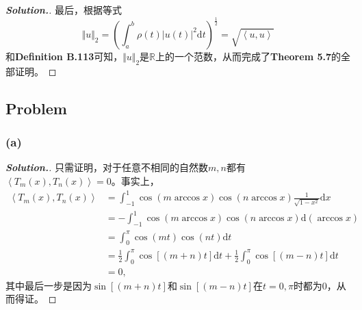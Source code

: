 \documentclass{ctexart}
\begin{document}
\begin{sloppypar}
\begin{proof}[\textbf{Solution.}]
最后，根据等式
\begin{equation}
    \Vert u \Vert_2 = \left(\int_a^b \rho (t)|u(t)|^2 \mathrm{d}t \right)^{\frac{1}{2}} = \sqrt{\left \langle u,u \right \rangle}
\end{equation}
和\textbf{Definition B.113}可知，$\Vert u \Vert_2$是$\mathbb{R}$上的一个范数，从而完成了\textbf{Theorem 5.7}的全部证明。
\end{proof}

\subsection*{Problem \uppercase\expandafter{}}
\subsubsection*{(a)}
\begin{proof}[\textbf{Solution.}]
只需证明，对于任意不相同的自然数$m,n$都有$\left \langle T_m(x),T_n(x) \right \rangle = 0$。事实上，
\begin{equation}
\begin{split}
    \left \langle T_m(x),T_n(x) \right \rangle &= \int_{-1}^1 \cos(m\arccos x)\cos(n\arccos x)\frac{1}{\sqrt{1-x^2}}  \mathrm{d}x \\
    & = -\int_{-1}^1 \cos(m\arccos x)\cos(n\arccos x) \mathrm{d}(\arccos x) \\
    & = \int_{0}^{\pi} \cos(mt)\cos(nt)\mathrm{d}t \\
    & = \frac{1}{2}\int_{0}^{\pi} \cos[(m+n)t]\mathrm{d}t + \frac{1}{2}\int_{0}^{\pi} \cos[(m-n)t]\mathrm{d}t \\
    & = 0,
\end{split}
\end{equation}
其中最后一步是因为$\sin[(m+n)t]$和$\sin[(m-n)t]$在$t = 0,\pi$时都为0，从而得证。
\end{proof}


\end{sloppypar}
\end{document}
